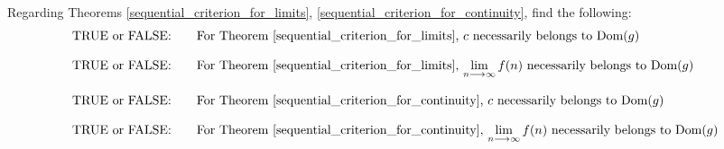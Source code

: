 \begin{exercise}
Regarding Theorems \ref{sequential_criterion_for_limits}, \ref{sequential_criterion_for_continuity}, find the following:
\begin{align*}
    &\text{TRUE or FALSE:} \hspace{20pt} \text{For Theorem \ref{sequential_criterion_for_limits}, $c$ necessarily belongs to Dom($g$)}\\[2ex]
    &\text{TRUE or FALSE:} \hspace{20pt} \text{For Theorem \ref{sequential_criterion_for_limits}, $\lim_{n \longrightarrow \infty} f(n)$ necessarily belongs to Dom($g$)}\\[2ex]
    &\text{TRUE or FALSE:} \hspace{20pt} \text{For Theorem \ref{sequential_criterion_for_continuity}, $c$ necessarily belongs to Dom($g$)}\\[2ex]
    &\text{TRUE or FALSE:} \hspace{20pt} \text{For Theorem \ref{sequential_criterion_for_continuity}, $\lim_{n \longrightarrow \infty} f(n)$ necessarily belongs to Dom($g$)}
\end{align*}
\end{exercise}


